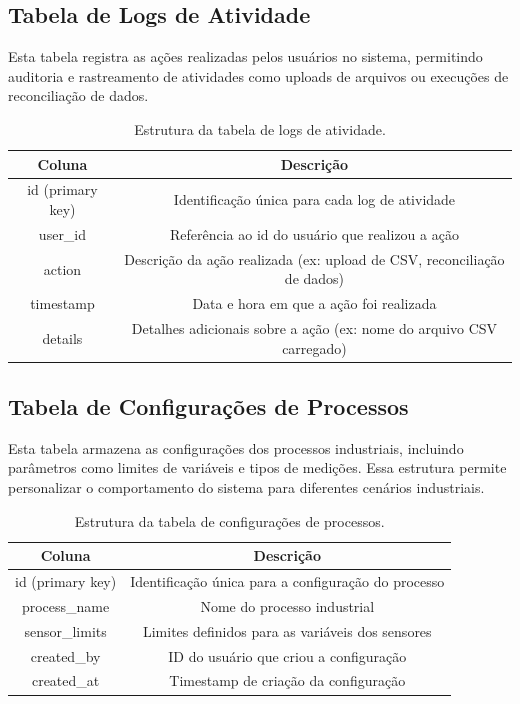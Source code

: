 \subsection{Tabela de Logs de Atividade}

Esta tabela registra as ações realizadas pelos usuários no sistema, permitindo auditoria e rastreamento de atividades como uploads de arquivos ou execuções de reconciliação de dados.

\begin{table}[htbp]
    \centering
    \caption{Estrutura da tabela de logs de atividade.}
    \label{Tab:ActivityLogs}
    \begin{tabular}{|c|c|}
        \hline
        \textbf{Coluna} & \textbf{Descrição} \\ \hline
        id (primary key) & Identificação única para cada log de atividade \\ \hline
        user\_id & Referência ao id do usuário que realizou a ação \\ \hline
        action & Descrição da ação realizada (ex: upload de CSV, reconciliação de dados) \\ \hline
        timestamp & Data e hora em que a ação foi realizada \\ \hline
        details & Detalhes adicionais sobre a ação (ex: nome do arquivo CSV carregado) \\ \hline
    \end{tabular}
\end{table}

\subsection{Tabela de Configurações de Processos}

Esta tabela armazena as configurações dos processos industriais, incluindo parâmetros como limites de variáveis e tipos de medições. Essa estrutura permite personalizar o comportamento do sistema para diferentes cenários industriais.

\begin{table}[htbp]
    \centering
    \caption{Estrutura da tabela de configurações de processos.}
    \label{Tab:ProcessConfigurations}
    \begin{tabular}{|c|c|}
        \hline
        \textbf{Coluna} & \textbf{Descrição} \\ \hline
        id (primary key) & Identificação única para a configuração do processo \\ \hline
        process\_name & Nome do processo industrial \\ \hline
        sensor\_limits & Limites definidos para as variáveis dos sensores \\ \hline
        created\_by & ID do usuário que criou a configuração \\ \hline
        created\_at & Timestamp de criação da configuração \\ \hline
    \end{tabular}
\end{table}

